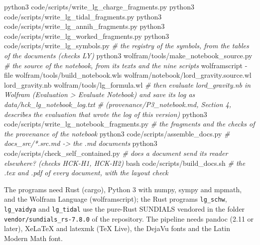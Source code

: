 \documentclass[
  10pt,
]{article}
\newenvironment{Shaded}{}{}
\newcommand{\AttributeTok}[1]{\textcolor[rgb]{0.49,0.56,0.16}{#1}}
\newcommand{\CommentTok}[1]{\textcolor[rgb]{0.38,0.63,0.69}{\textit{#1}}}
\newcommand{\ExtensionTok}[1]{#1}
\newcommand{\FunctionTok}[1]{\textcolor[rgb]{0.02,0.16,0.49}{#1}}
\newcommand{\NormalTok}[1]{#1}
\begin{document}
\begin{Shaded}
\begin{Highlighting}[]
\ExtensionTok{python3}\NormalTok{ code/scripts/write\_lg\_charge\_fragments.py}
\ExtensionTok{python3}\NormalTok{ code/scripts/write\_lg\_tidal\_fragments.py}
\ExtensionTok{python3}\NormalTok{ code/scripts/write\_lg\_annih\_fragments.py}
\ExtensionTok{python3}\NormalTok{ code/scripts/write\_lg\_worked\_fragments.py}
\ExtensionTok{python3}\NormalTok{ code/scripts/write\_lg\_symbols.py       }\CommentTok{\# the registry of the symbols, from the tables of the documents (checks LY)}
\ExtensionTok{python3}\NormalTok{ wolfram/tools/make\_notebook\_source.py  }\CommentTok{\# the source of the notebook, from its texts and the nine scripts}
\ExtensionTok{wolframscript} \AttributeTok{{-}file}\NormalTok{ wolfram/tools/build\_notebook.wls wolfram/notebook/lord\_gravity.source.wl lord\_gravity.nb wolfram/tools/lg\_formula.wl}
\CommentTok{\# then evaluate lord\_gravity.nb in Wolfram (Evaluation \textgreater{} Evaluate Notebook) and save its log as data/hck\_lg\_notebook\_log.txt}
\CommentTok{\# (provenance/P3\_notebook.md, Section 4, describes the evaluation that wrote the log of this version)}
\ExtensionTok{python3}\NormalTok{ code/scripts/write\_lg\_notebook\_fragments.py   }\CommentTok{\# the fragments and the checks of the provenance of the notebook}
\ExtensionTok{python3}\NormalTok{ code/scripts/assemble\_docs.py          }\CommentTok{\# docs\_src/*.src.md {-}\textgreater{} the .md documents}
\ExtensionTok{python3}\NormalTok{ code/scripts/check\_self\_contained.py   }\CommentTok{\# does a document send its reader elsewhere? (checks HCK{-}H1, HCK{-}H2)}
\FunctionTok{bash}\NormalTok{ code/scripts/build\_docs.sh                }\CommentTok{\# the .tex and .pdf of every document, with the layout check}
\end{Highlighting}
\end{Shaded}

The programs need Rust (cargo), Python 3 with numpy, sympy and mpmath,
and the Wolfram Language (wolframscript); the Rust programs
\texttt{lg\_schw}, \texttt{lg\_vaidya} and \texttt{lg\_tidal} use the
pure-Rust SUNDIALS vendored in the folder
\texttt{vendor/sundials\_rs-7.8.0} of the repository. The pipeline needs
pandoc (2.11 or later), XeLaTeX and latexmk (TeX Live), the DejaVu fonts
and the Latin Modern Math font.
\end{document}

